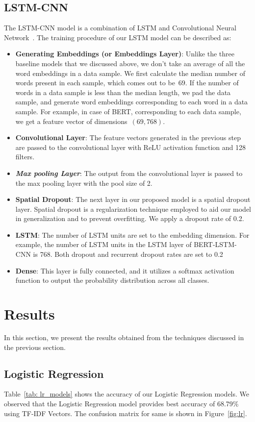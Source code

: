 \documentclass[conference]{IEEEtran}
\begin{document}
\subsection{LSTM-CNN}
The LSTM-CNN model is a combination of LSTM and Convolutional Neural Network~\cite{cnn}. The training procedure of our LSTM model can be described as:
\begin{itemize}
    \item \textbf{Generating Embeddings (or Embeddings Layer)}: Unlike the three baseline models that we discussed above, we don't take an average of all the word embeddings in a data sample. We first calculate the median number of words present in each sample, which comes out to be~$69$. If the number of words in a data sample is less than the median length, we pad the data sample, and generate word embeddings corresponding to each word in a data sample. For example, in case of BERT, corresponding to each data sample, we get a feature vector of dimensions~$(69, 768)$.
    \item \textbf{Convolutional Layer}: The feature vectors generated in the previous step are passed to the convolutional layer with ReLU activation function and 128 filters.
    \item \textbf{\textit{Max pooling Layer}}: The output from the convolutional layer is passed to the max pooling layer with the pool size of 2.
    \item \textbf{Spatial Dropout}: The next layer in our proposed model is a spatial dropout layer. Spatial dropout is a regularization technique employed to aid our model in generalization and to prevent overfitting. We apply a dropout rate of 0.2.
    \item \textbf{LSTM}: The number of LSTM units are set to the embedding dimension. For example, the number of LSTM units in the LSTM layer of BERT-LSTM-CNN is 768. Both dropout and recurrent dropout rates are set to 0.2
    \item \textbf{Dense}: This layer is fully connected, and it utilizes a softmax activation function to output the probability distribution across all classes.
\end{itemize}
\section{Results}
In this section, we present the results obtained from the techniques discussed in the previous section.

\subsection{Logistic Regression}
Table~\ref{tab: lr_models} shows the accuracy of our Logistic Regression models. We observed that the Logistic Regression model provides best accuracy of 68.79\% using TF-IDF Vectors. The confusion matrix for same is shown in Figure~\ref{fig:lr}.
\end{document}
